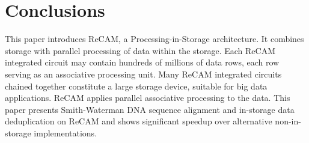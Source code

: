 \documentclass{superfri}
\begin{document}
\section{Conclusions}

This paper introduces ReCAM, a Processing-in-Storage architecture. It combines storage with parallel processing of data within the storage. Each ReCAM integrated circuit may contain hundreds of millions of data rows, each row serving as an associative processing unit. Many ReCAM integrated circuits chained together constitute a large storage device, suitable for big data applications. ReCAM applies parallel associative processing to the data. This paper presents Smith-Waterman DNA sequence alignment and in-storage data deduplication on ReCAM and shows significant speedup over alternative non-in-storage implementations. 




\end{document}
